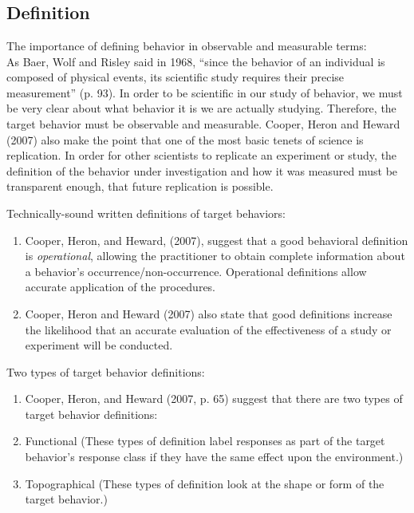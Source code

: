 \clearpage \section[\fouriOne{}]{\fouriOne{}%
              }
\subsection{Definition}
The importance of defining behavior in observable and measurable terms:\\
As Baer, Wolf and Risley said in 1968, ``since the behavior of an individual is composed of physical events, its scientific study requires their precise measurement'' (p. 93). In order to be scientific in our study of behavior, we must be very clear about what behavior it is we are actually studying. Therefore, the target behavior must be observable and measurable. Cooper, Heron and Heward (2007) also make the point that one of the most basic tenets of science is replication. In order for other scientists to replicate an experiment or study, the definition of the behavior under investigation and how it was measured must be transparent enough, that future replication is possible.

Technically-sound written definitions of target behaviors:\\
\begin{enumerate}
\item Cooper, Heron, and Heward, (2007), suggest that a good behavioral definition is \textit{operational}, allowing the practitioner to obtain complete information about a behavior's occurrence/non-occurrence. Operational definitions allow accurate application of the procedures.
\item Cooper, Heron and Heward (2007) also state that good definitions increase the likelihood that an accurate evaluation of the effectiveness of a study or experiment will be conducted.
\end{enumerate}

Two types of target behavior definitions:\\
\begin{enumerate}
\item Cooper, Heron, and Heward (2007, p. 65) suggest that there are two types of target behavior definitions:
\item Functional (These types of definition label responses as part of the target behavior's response class if they have the same effect upon the environment.)
\item Topographical (These types of definition look at the shape or form of the target behavior.)
\end{enumerate}


